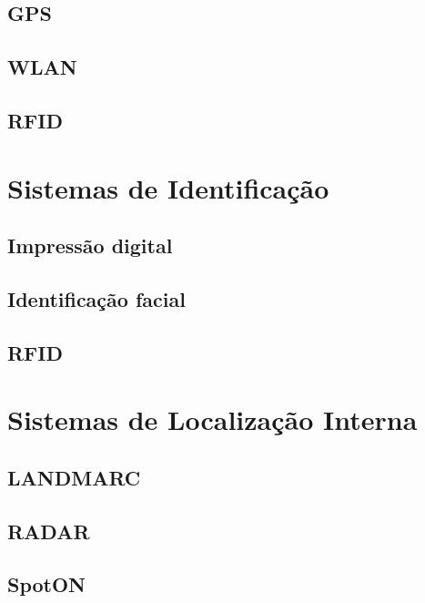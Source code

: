     \subsection{GPS}
    \subsection{WLAN}
    \subsection{RFID}
\section{Sistemas de Identificação}
    \subsection{Impressão digital}
    \subsection{Identificação facial}
    \subsection{RFID}
\section{Sistemas de Localização Interna}
    \subsection{LANDMARC}
    \subsection{RADAR}
    \subsection{SpotON}